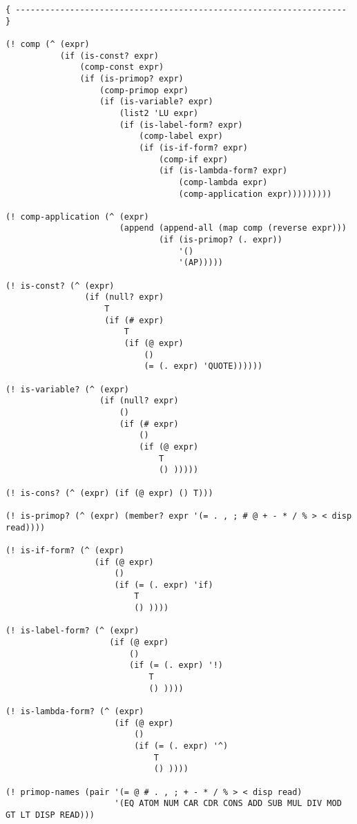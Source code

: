 \documentclass[a4paper]{article}
\begin{document}
\begin{verbatim}
{ ------------------------------------------------------------------- }

(! comp (^ (expr)
           (if (is-const? expr)
               (comp-const expr)
               (if (is-primop? expr)
                   (comp-primop expr)
                   (if (is-variable? expr)
                       (list2 'LU expr)
                       (if (is-label-form? expr)
                           (comp-label expr)
                           (if (is-if-form? expr)
                               (comp-if expr)
                               (if (is-lambda-form? expr)
                                   (comp-lambda expr)
                                   (comp-application expr)))))))))

(! comp-application (^ (expr)
                       (append (append-all (map comp (reverse expr)))
                               (if (is-primop? (. expr))
                                   '()
                                   '(AP)))))

(! is-const? (^ (expr)
                (if (null? expr)
                    T
                    (if (# expr)
                        T
                        (if (@ expr)
                            ()
                            (= (. expr) 'QUOTE))))))

(! is-variable? (^ (expr)
                   (if (null? expr)
                       ()
                       (if (# expr)
                           ()
                           (if (@ expr)
                               T
                               () )))))

(! is-cons? (^ (expr) (if (@ expr) () T)))

(! is-primop? (^ (expr) (member? expr '(= . , ; # @ + - * / % > < disp read))))

(! is-if-form? (^ (expr)
                  (if (@ expr)
                      ()
                      (if (= (. expr) 'if)
                          T
                          () ))))

(! is-label-form? (^ (expr)
                     (if (@ expr)
                         ()
                         (if (= (. expr) '!)
                             T
                             () ))))

(! is-lambda-form? (^ (expr)
                      (if (@ expr)
                          ()
                          (if (= (. expr) '^)
                              T
                              () ))))

(! primop-names (pair '(= @ # . , ; + - * / % > < disp read)
                      '(EQ ATOM NUM CAR CDR CONS ADD SUB MUL DIV MOD GT LT DISP READ)))


\end{verbatim}
\end{document}
